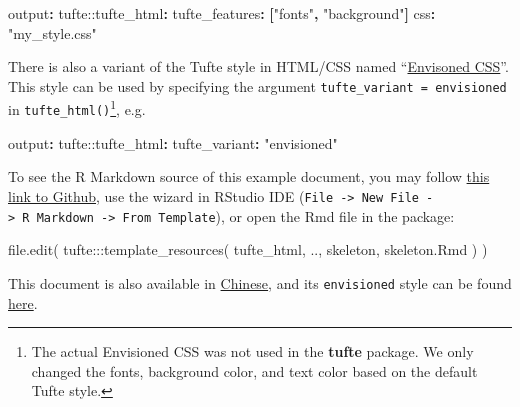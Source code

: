 \documentclass[]{tufte-handout}
\newenvironment{Shaded}{}{}
\newcommand{\AttributeTok}[1]{\textcolor[rgb]{0.49,0.56,0.16}{#1}}
\newcommand{\FunctionTok}[1]{\textcolor[rgb]{0.02,0.16,0.49}{#1}}
\newcommand{\KeywordTok}[1]{\textcolor[rgb]{0.00,0.44,0.13}{\textbf{#1}}}
\newcommand{\NormalTok}[1]{#1}
\newcommand{\SpecialCharTok}[1]{\textcolor[rgb]{0.25,0.44,0.63}{#1}}
\newcommand{\StringTok}[1]{\textcolor[rgb]{0.25,0.44,0.63}{#1}}
\begin{document}
\begin{Shaded}
\begin{Highlighting}[]
\FunctionTok{output}\KeywordTok{:}
\AttributeTok{  tufte:}\FunctionTok{:tufte\_html}\KeywordTok{:}
\AttributeTok{    }\FunctionTok{tufte\_features}\KeywordTok{:}\AttributeTok{ }\KeywordTok{[}\StringTok{"fonts"}\KeywordTok{,}\AttributeTok{ }\StringTok{"background"}\KeywordTok{]}
\AttributeTok{    }\FunctionTok{css}\KeywordTok{:}\AttributeTok{ }\StringTok{"my\_style.css"}
\end{Highlighting}
\end{Shaded}

There is also a variant of the Tufte style in HTML/CSS named
``\href{https://github.com/nogginfuel/envisioned-css}{Envisoned CSS}''.
This style can be used by specifying the argument
\texttt{tufte\_variant\ =\ \textquotesingle{}envisioned\textquotesingle{}}
in \texttt{tufte\_html()}\footnote{The actual Envisioned CSS was not
  used in the \textbf{tufte} package. We only changed the fonts,
  background color, and text color based on the default Tufte style.},
e.g.

\begin{Shaded}
\begin{Highlighting}[]
\FunctionTok{output}\KeywordTok{:}
\AttributeTok{  tufte:}\FunctionTok{:tufte\_html}\KeywordTok{:}
\AttributeTok{    }\FunctionTok{tufte\_variant}\KeywordTok{:}\AttributeTok{ }\StringTok{"envisioned"}
\end{Highlighting}
\end{Shaded}

To see the R Markdown source of this example document, you may follow
\href{https://github.com/rstudio/tufte/raw/main/inst/rmarkdown/templates/tufte_html/skeleton/skeleton.Rmd}{this
link to Github}, use the wizard in RStudio IDE
(\texttt{File\ -\textgreater{}\ New\ File\ -\textgreater{}\ R\ Markdown\ -\textgreater{}\ From\ Template}),
or open the Rmd file in the package:

\begin{Shaded}
\begin{Highlighting}[]
\FunctionTok{file.edit}\NormalTok{(}
\NormalTok{  tufte}\SpecialCharTok{:::}\FunctionTok{template\_resources}\NormalTok{(}
    \StringTok{\textquotesingle{}tufte\_html\textquotesingle{}}\NormalTok{, }\StringTok{\textquotesingle{}..\textquotesingle{}}\NormalTok{, }\StringTok{\textquotesingle{}skeleton\textquotesingle{}}\NormalTok{, }\StringTok{\textquotesingle{}skeleton.Rmd\textquotesingle{}}
\NormalTok{  )}
\NormalTok{)}
\end{Highlighting}
\end{Shaded}

This document is also available in
\href{https://rstudio.github.io/tufte/cn/}{Chinese}, and its
\texttt{envisioned} style can be found
\href{https://rstudio.github.io/tufte/envisioned/}{here}.


\end{document}
